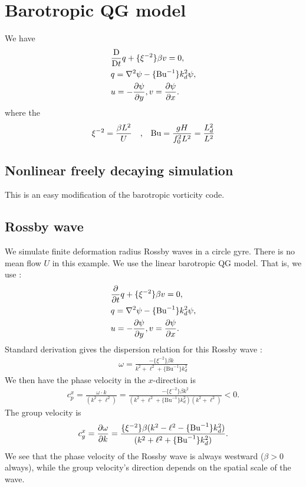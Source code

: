 \graphicspath{{QG/code/}}
\renewcommand{\Bu}{\text{Bu}}
\renewcommand{\Ub}{\text{Bu}^{-1}}

\section{Barotropic QG model}
We have
\begin{align}
    &\frac{\DD}{\DD t} q+\{\xi^{-2}\}\beta v = 0,\\
    &q = \nabla^2\psi - \{\Bu^{-1}\} k_d^2\psi,\\
    &u = -\frac{\pe\psi}{\pe y}, v = \frac{\pe\psi}{\pe x}.
\end{align}
where the 
\begin{align}
    \xi^{-2} = \frac{\beta L^2}{U} \quad \mbox{,} \quad \text{Bu} = \frac{gH}{f_0^2L^2} = \frac{L_{d}^2}{L^2}
\end{align}

\subsection{Nonlinear freely decaying simulation}
This is an easy modification of the barotropic vorticity code.

\subsection{Rossby wave}
We simulate finite deformation radius Rossby waves in a circle gyre. There is no mean flow $U$ in this example. We use the linear barotropic QG model. That is, we use \parencite[(6.64)]{Vallis_17}:
\begin{align}
    &\frac{\pe}{\pe t} q+\{\xi^{-2}\}\beta v = 0,\\
    &q = \nabla^2\psi - \{\Bu^{-1}\} k_d^2\psi,\\
    &u = -\frac{\pe\psi}{\pe y}, v = \frac{\pe\psi}{\pe x}.
\end{align}
Standard derivation gives the dispersion relation for this Rossby wave \parencite[(RW.3)]{Vallis_17}:
\begin{align}
    \omega = \frac{-\{\xi^{-2}\}\beta k}{k^2+\ell^2+\{\Bu^{-1}\}k_d^2}
\end{align}
We then have the phase velocity in the $x$-direction is
\begin{align}
    c_p^x = \frac{\omega\cdot k}{(k^2+\ell^2)} = \frac{-\{\xi^{-2}\}\beta k^2}{(k^2+\ell^2+\{\Bu^{-1}\}k_d^2)(k^2+\ell^2)}<0.
\end{align}
The group velocity is \parencite[(RW.4)]{Vallis_17}
\begin{align}
    c_g^x = \frac{\pe\omega}{\pe k} = \frac{\{\xi^{-2}\}\beta(k^2-\ell^2-\{\Bu^{-1}\}k_d^2)}{(k^2+\ell^2+\{\Bu^{-1}\}k_d^2)}.
\end{align}
We see that the phase velocity of the Rossby wave is always westward ($\beta>0$ always), while the group velocity's direction depends on the spatial scale of the wave.

